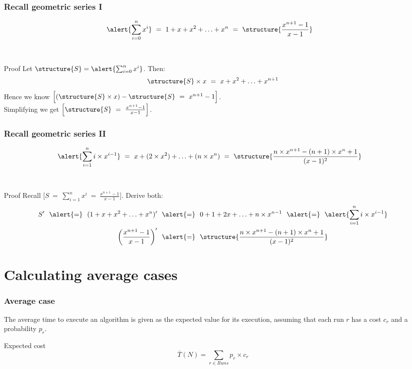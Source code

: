 \documentclass[aspectratio=169]{beamer}
\begin{document}
\begin{frame}\frametitle{Recall geometric series I} 
\begin{align*}
  \alert{\sum_{i=0}^n x^i} &~=~ 1 + x + x^2 + \ldots + x^n ~=~
      \structure{\frac{x^{n+1}-1}{x-1}}
\end{align*}

~\\[2mm]

\begin{block}{Proof}
\centering
Let $\structure{S}=\alert{\sum_{i=0}^n x^i}$. Then:
$$\structure{S}\times x ~=~ x + x^2 + \ldots + x^{n+1}$$
Hence we know $\Big[(\structure{S}\times x)-\structure{S} ~=~ x^{n+1}-1\Big]$.
\\
Simplifying we get $\Big[\structure{S} ~=~ \frac{x^{n+1}-1}{x-1}\Big]$.
\end{block}
\end{frame}

\begin{frame}\frametitle{Recall geometric series II}
\begin{align*}
  \alert{\sum_{i=1}^n i \times x^{i-1}} &~=~ x + (2\times x^2) + \ldots + (n\times x^n) ~=~
      \structure{\frac{n\times x^{n+1}-(n+1)\times x^n +1}{(x-1)^2}}
\end{align*}

~\\[2mm]

\begin{block}{Proof}
\centering
Recall $\Big[S ~=~ \sum_{i=1}^n x^i ~=~ \frac{x^{n+1}-1}{x-1}\Big]$.
Derive both:
\begin{align*}
 S'
   ~~\alert{=}~~ (1 + x + x^2 + \ldots + x^n)'
  &~~\alert{=}~~ 0 + 1 + 2x + \ldots + n\times x^{n-1}
   ~~\alert{=}~~\alert{\sum_{i=1}^n i \times x^{i-1}}
\\
\left(\frac{x^{n+1}-1}{x-1}\right)'
  &~~\alert{=}~~
   \structure{\frac{n\times x^{n+1}-(n+1)\times x^n +1}{(x-1)^2}}
\end{align*}
\end{block}
\end{frame}


\section{Calculating average cases}


\begin{frame}\frametitle{Average case}
    
The average time to execute an algorithm is given as the \alert{expected value} for its execution, assuming that each run $r$ has a cost $c_r$ and a probability $p_r$.

\begin{block}{Expected cost}
  $$\overline{T}(N) = \sum_{r\in Runs} p_r \times c_r$$
\end{block}
\end{frame}
\end{document}

